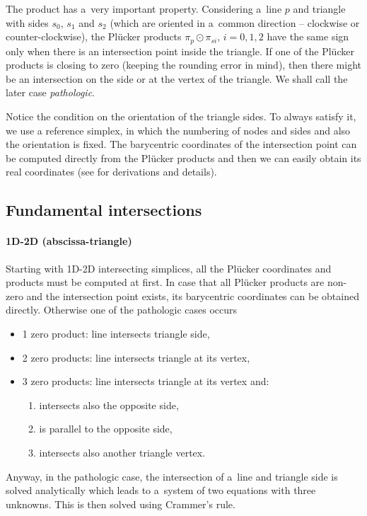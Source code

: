 \documentclass[FM,Dis]{tulthesis}
\begin{document}
The product has a~very important property. Considering a~line $p$ and triangle with sides 
$s_0$, $s_1$ and $s_2$ (which are oriented in a~common direction -- clockwise or counter-clockwise), 
the Pl\"{u}cker products $\pi_p \odot \pi_{si},\, i=0,1,2$ have the same sign only when there
is an intersection point inside the triangle.
If one of the Pl\"{u}cker products is closing to zero (keeping the rounding error in mind), 
then there might be an intersection on the side 
or at the vertex of the triangle. We shall call the later case \emph{pathologic}.

Notice the condition on the orientation of the triangle sides. To always satisfy it, we use a
reference simplex, in which the numbering of nodes and sides and also the orientation is fixed.
The barycentric coordinates of the intersection point can be computed directly from the Pl\"{u}cker products
and then we can easily obtain its real coordinates (see \cite{fris_dp_2015} for derivations and details).

\subsection{Fundamental intersections}
\paragraph{1D-2D (abscissa-triangle)}
Starting with 1D-2D intersecting simplices, all the Pl\"{u}cker coordinates and products must be computed at first.
In case that all Pl\"{u}cker products are non-zero and the intersection point exists, its barycentric coordinates 
can be obtained directly. Otherwise one of the pathologic cases occurs
%
\begin{itemize}[itemsep=-3pt]
\item 1 zero product: line intersects triangle side,
\item 2 zero products: line intersects triangle at its vertex,
\item 3 zero products: line intersects triangle at its vertex and:
  \begin{enumerate}[label=\alph*), itemsep=-3pt]
    \item intersects also the opposite side,
    \item is parallel to the opposite side,
    \item intersects also another triangle vertex.
  \end{enumerate}
\end{itemize}
%
Anyway, in the pathologic case, the intersection of a~line and triangle side is solved analytically which leads
to a~system of two equations with three unknowns. This is then solved using Crammer's rule.
\end{document}

